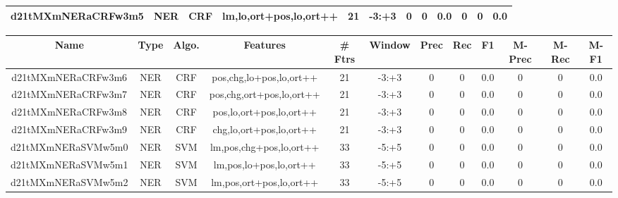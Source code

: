 \documentclass[a4paper]{article}
\begin{document}
\begin{landscape}
\begin{center}
\begin{tabular}{ |c|c|c|c|c|c|c|c|c|c|c|c|}
 
 	
 	\small{ d21tMXmNERaCRFw3m5 } & \small{ NER} & \small{  CRF }  & lm,lo,ort+pos,lo,ort++  &  21 &  \small{  -3:+3 }  &  0 & 0 & 0.0  &  0 & 0 & 0.0 \\
 	
 \hline
\end{tabular}
\end{center}




\begin{center}
\begin{tabular}{ |c|c|c|c|c|c|c|c|c|c|c|c|} 
 \hline
 	Name & Type & Algo. & Features & \# Ftrs & Window & Prec & Rec & F1 & M-Prec & M-Rec & M-F1\\
 \hline

 	

 
 	
 	\small{ d21tMXmNERaCRFw3m6 } & \small{ NER} & \small{  CRF }  & pos,chg,lo+pos,lo,ort++  &  21 &  \small{  -3:+3 }  &  0 & 0 & 0.0  &  0 & 0 & 0.0 \\
 	

 
 	
 	\small{ d21tMXmNERaCRFw3m7 } & \small{ NER} & \small{  CRF }  & pos,chg,ort+pos,lo,ort++  &  21 &  \small{  -3:+3 }  &  0 & 0 & 0.0  &  0 & 0 & 0.0 \\
 	

 
 	
 	\small{ d21tMXmNERaCRFw3m8 } & \small{ NER} & \small{  CRF }  & pos,lo,ort+pos,lo,ort++  &  21 &  \small{  -3:+3 }  &  0 & 0 & 0.0  &  0 & 0 & 0.0 \\
 	

 
 	
 	\small{ d21tMXmNERaCRFw3m9 } & \small{ NER} & \small{  CRF }  & chg,lo,ort+pos,lo,ort++  &  21 &  \small{  -3:+3 }  &  0 & 0 & 0.0  &  0 & 0 & 0.0 \\
 	

 
 	
 	\small{ d21tMXmNERaSVMw5m0 } & \small{ NER} & \small{  SVM }  & lm,pos,chg+pos,lo,ort++  &  33 &  \small{  -5:+5 }  &  0 & 0 & 0.0  &  0 & 0 & 0.0 \\
 	

 
 	
 	\small{ d21tMXmNERaSVMw5m1 } & \small{ NER} & \small{  SVM }  & lm,pos,lo+pos,lo,ort++  &  33 &  \small{  -5:+5 }  &  0 & 0 & 0.0  &  0 & 0 & 0.0 \\
 	

 
 	
 	\small{ d21tMXmNERaSVMw5m2 } & \small{ NER} & \small{  SVM }  & lm,pos,ort+pos,lo,ort++  &  33 &  \small{  -5:+5 }  &  0 & 0 & 0.0  &  0 & 0 & 0.0 \\
 	


\end{tabular}
\end{center}
\end{landscape}
\end{document}
